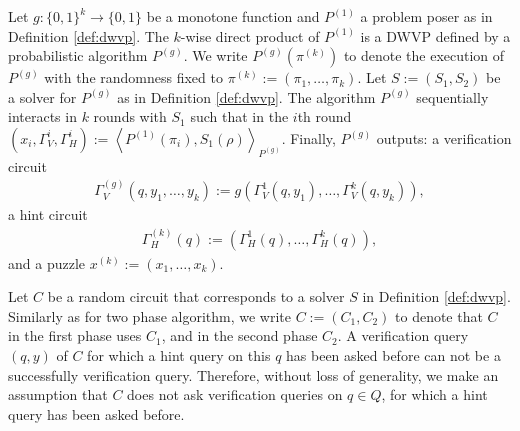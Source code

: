 \begin{definition}
Let $g: \{0,1\}^{k} \rightarrow \{0,1\}$ be a monotone function and $P^{(1)}$ a problem poser as in Definition \ref{def:dwvp}.
The $k$-wise direct product of $P^{(1)}$ is a DWVP defined by a probabilistic algorithm $P^{(g)}$.
We write $P^{(g)}(\pi^{(k)})$ to denote the execution of $P^{(g)}$ with the randomness fixed to $\pi^{(k)} := (\pi_1, \dots, \pi_k)$.
Let $S := (S_1, S_2)$ be a solver for $P^{(g)}$ as in Definition \ref{def:dwvp}.
The algorithm $P^{(g)}$ sequentially interacts in $k$ rounds with $S_1$ such that
in the $i$th round $(x_i, \Gamma_V^{i}, \Gamma_H^{i} ) := \left\langle P^{(1)}(\pi_i), S_1(\rho) \right\rangle_{P^{(g)}}$.
Finally, $P^{(g)}$ outputs:
a verification circuit
\begin{align*}
  \Gamma_V^{(g)} (q, y_1, \dots, y_k) := g(\Gamma_V^{1}(q, y_1), \dots, \Gamma_V^{k}(q, y_k)),
\end{align*}
a hint circuit
\begin{align*}
  \Gamma_H^{(k)} (q) := (\Gamma_H^{1}(q), \dots, \Gamma_H^{k}(q)),
\end{align*}
and a puzzle $x^{(k)} := (x_1, \dots, x_k)$.

\end{definition}
%
Let $C$ be a random circuit that corresponds to a solver $S$ in Definition \ref{def:dwvp}.
Similarly as for two phase algorithm, we write $C := (C_1, C_2)$ to denote that $C$ in the first phase uses $C_1$,
and in the second phase $C_2$.
%
A verification query $(q,y)$ of $C$ for which a hint query on this $q$ has been asked before can not be a successfully verification query.
Therefore, without loss of generality, we make an assumption that $C$ does not ask verification queries on $q \in Q$,
for which a hint query has been asked before.

